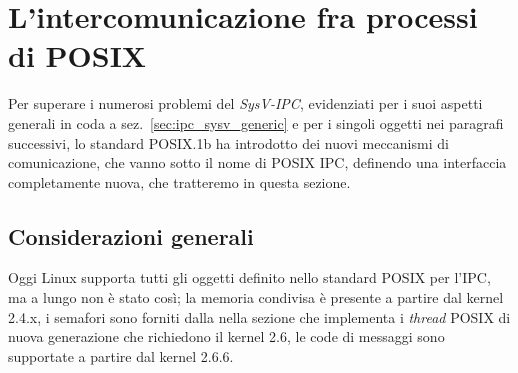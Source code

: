 




\section{L'intercomunicazione fra processi di POSIX}
\label{sec:ipc_posix}

Per superare i numerosi problemi del \textit{SysV-IPC}, evidenziati per i suoi
aspetti generali in coda a sez.~\ref{sec:ipc_sysv_generic} e per i singoli
oggetti nei paragrafi successivi, lo standard POSIX.1b ha introdotto dei nuovi
meccanismi di comunicazione, che vanno sotto il nome di POSIX IPC, definendo
una interfaccia completamente nuova, che tratteremo in questa sezione.


\subsection{Considerazioni generali}
\label{sec:ipc_posix_generic}

Oggi Linux supporta tutti gli oggetti definito nello standard POSIX per l'IPC,
ma a lungo non è stato così; la memoria condivisa è presente a partire dal
kernel 2.4.x, i semafori sono forniti dalla  nella sezione che
implementa i \textit{thread} POSIX di nuova generazione che richiedono il
kernel 2.6, le code di messaggi sono supportate a partire dal kernel 2.6.6.

